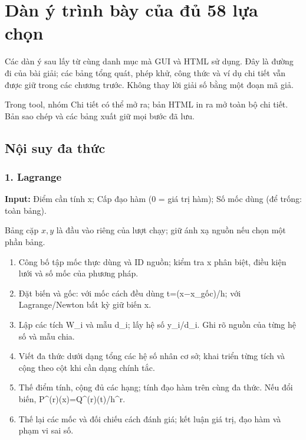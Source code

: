 \section{Dàn ý trình bày của đủ 58 lựa chọn}

Các dàn ý sau lấy từ cùng danh mục mà GUI và HTML sử dụng. Đây là đường đi của bài giải; các bảng tổng quát, phép khử, công thức và ví dụ chi tiết vẫn được giữ trong các chương trước. Không thay lời giải số bằng một đoạn mã giả.

Trong tool, nhóm Chi tiết có thể mở ra; bản HTML in ra mở toàn bộ chi tiết. Bản sao chép và các bảng xuất giữ mọi bước đã lưu.

\subsection{Nội suy đa thức}

\examplebreak\subsubsection*{1. Lagrange}

\textbf{Input:} Điểm cần tính x;\allowbreak{} Cấp đạo hàm (\allowbreak{}0 =\allowbreak{} giá trị hàm);\allowbreak{} Số mốc dùng (\allowbreak{}để trống: toàn bảng).

Bảng cặp $x,y$ là đầu vào riêng của lượt chạy; giữ ánh xạ nguồn nếu chọn một phần bảng.

\begin{enumerate}

\item Công bố tập mốc thực dùng và ID nguồn;\allowbreak{} kiểm tra x phân biệt,\allowbreak{} điều kiện lưới và số mốc của phương pháp.

\item Đặt biến và gốc: với mốc cách đều dùng t=\allowbreak{}(\allowbreak{}x\ensuremath{-}x\_gốc)/\allowbreak{}h;\allowbreak{} với Lagrange/\allowbreak{}Newton bất kỳ giữ biến x.

\item Lập các tích W\_i và mẫu d\_i;\allowbreak{} lấy hệ số y\_i/\allowbreak{}d\_i. Ghi rõ nguồn của từng hệ số và mẫu chia.

\item Viết đa thức dưới dạng tổng các hệ số nhân cơ sở;\allowbreak{} khai triển từng tích và cộng theo cột khi cần dạng chính tắc.

\item Thế điểm tính,\allowbreak{} cộng đủ các hạng;\allowbreak{} tính đạo hàm trên cùng đa thức. Nếu đổi biến,\allowbreak{} P\textasciicircum{}(\allowbreak{}r)(\allowbreak{}x)=\allowbreak{}Q\textasciicircum{}(\allowbreak{}r)(\allowbreak{}t)/\allowbreak{}h\textasciicircum{}r.

\item Thế lại các mốc và đối chiếu cách đánh giá;\allowbreak{} kết luận giá trị,\allowbreak{} đạo hàm và phạm vi sai số.

\end{enumerate}


